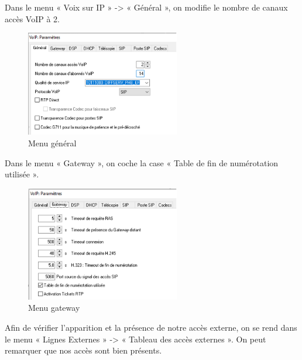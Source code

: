 \documentclass[12pt, a4paper]{article}
\begin{document}
Dans le menu « Voix sur IP » -> « Général », on modifie le nombre de canaux accès VoIP à 2.

\begin{figure}[H]
	\centering
	\includegraphics[width=0.6\textwidth]{img/menug.png}
	\caption{Menu général}
	\label{fig:menug}
\end{figure}

Dans le menu « Gateway », on coche la case « Table de fin de numérotation utilisée ».

\begin{figure}[H]
	\centering
	\includegraphics[width=0.6\textwidth]{img/mg.png}
	\caption{Menu gateway}
	\label{fig:mg}
\end{figure}

Afin de vérifier l’apparition et la présence de notre accès externe, on se rend dans le
menu « Lignes Externes » -> « Tableau des accès externes ». On peut remarquer que nos accès
sont bien présents.
\end{document}
